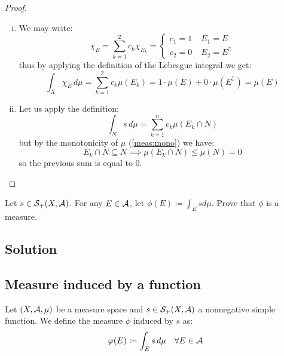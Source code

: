 \begin{proof}
    \hspace*{\fill} %
    \begin{enumerate}[i)]
        \item We may write:
            \[
                \chi_E = \sum_{k=1}^2 c_k \chi_{E_k} = \begin{cases}
                    c_1 = 1 & \;E_1 = E \\
                    c_2 = 0 & \; E_2 = E^\complement
                \end{cases}
            \]
            thus by applying the definition of the Lebesgue integral we get:
            \[
                \int_X \chi_E\,d\mu = \sum_{k=1}^2 c_k \mu(E_k) = 1\cdot\mu(E) + 0 \cdot \mu(E^\complement) = \mu(E)
            \]
        \item Let us apply the definition:
            \[
                \int_N s\,d\mu = \sum_{k=1}^n c_k \mu(E_k\cap N)
            \]
            but by the monotonicity of $\mu$ (\ref{meas:mono}) we have:
            \[
                E_k\cap N \subseteq N \implies \mu(E_k\cap N) \leq \mu(N) = 0      
            \]
            so the previous sum is equal to $0$.
    \end{enumerate}
\end{proof}

\question

Let $s \in \mathcal{S}_+(X, \mathcal{A})$. For any $E \in \mathcal{A}$, let $\phi(E) \coloneqq \int_E s d\mu$. Prove that $\phi$ is a measure.

\subsection*{Solution}

\subsection{Measure induced by a function}
Let $(X,\mathcal{A},\mu)$ be a measure space and $s\in\mathcal{S}_+(X,\mathcal{A})$ a nonnegative simple function. We define the measure $\phi$ induced by $s$ as:
\[
    \varphi(E) \coloneqq \int_E s\,d\mu \quad \forall E\in \mathcal{A}
\]

